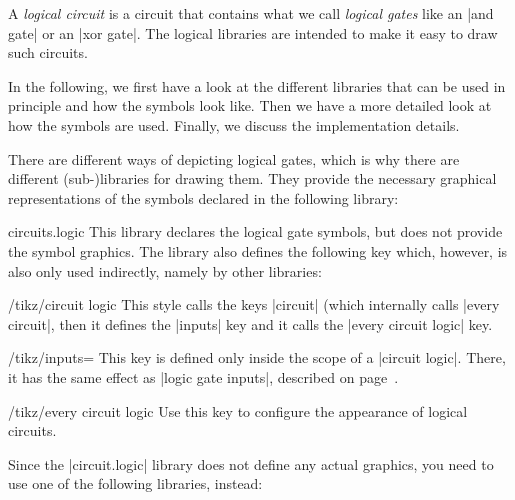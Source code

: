 A \emph{logical circuit} is a circuit that contains what we call
\emph{logical gates} like an |and gate| or an |xor gate|. The logical
libraries are intended to make it easy to draw such circuits.

In the following, we first have a look at the different libraries that
can be used in principle and how the symbols look like. Then we have a
more detailed look at how the symbols are used. Finally, we discuss
the implementation details.

There are different ways of depicting logical gates, which is why there
are different (sub-)libraries for drawing them. They provide the
necessary graphical representations of the symbols declared in the
following library:

\begin{tikzlibrary}{circuits.logic}
  This library declares the logical gate symbols, but does not
  provide the symbol graphics.
  The library also defines the following key which, however, is also
  only used indirectly, namely by other libraries:
  \begin{key}{/tikz/circuit logic}
    This style calls the keys |circuit| (which internally calls
    |every circuit|, then it defines the |inputs| key and it calls the
    |every circuit logic| key.
    \begin{key}{/tikz/inputs=}
      This key is defined only inside the scope of a
      |circuit logic|. There, it has the same effect as
      |logic gate inputs|, described on
      page~\pageref{logic-gate-inputs}.
    \end{key}
    \begin{stylekey}{/tikz/every circuit logic}
      Use this key to configure the appearance of logical circuits.
    \end{stylekey}
  \end{key}
\end{tikzlibrary}

Since the |circuit.logic| library does not define any actual graphics,
you need to use one of the following libraries, instead:

